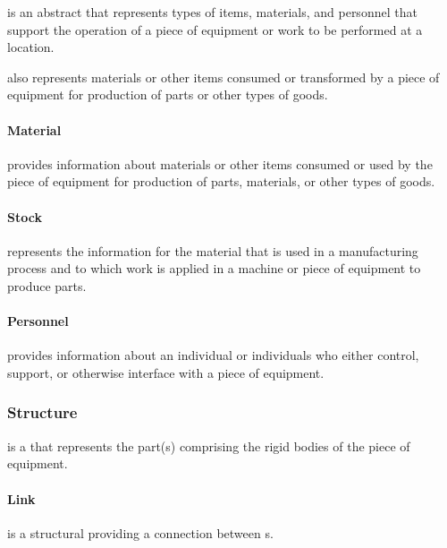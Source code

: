  is an abstract  that represents types of items, materials, and personnel that support the operation of a piece of equipment or work to be performed at a location.

 also represents materials or other items consumed or transformed by a piece of equipment for production of parts or other types of goods.


\paragraph{Material}\mbox{}
\label{sec:Material}


 provides information about materials or other items consumed or used by the piece of equipment for production of parts, materials, or other types of goods.


\paragraph{Stock}\mbox{}
\label{sec:Stock}


 represents the information for the material that is used in a manufacturing process and to which work is applied in a machine or piece of equipment to produce parts.


\paragraph{Personnel}\mbox{}
\label{sec:Personnel}


 provides information about an individual or individuals who either control, support, or otherwise interface with a piece of equipment.



\subsubsection{Structure}
\label{sec:Structure}



 is a  that represents the part(s) comprising the rigid bodies of the piece of equipment.


\paragraph{Link}\mbox{}
\label{sec:Link}


 is a structural  providing a connection between s.


